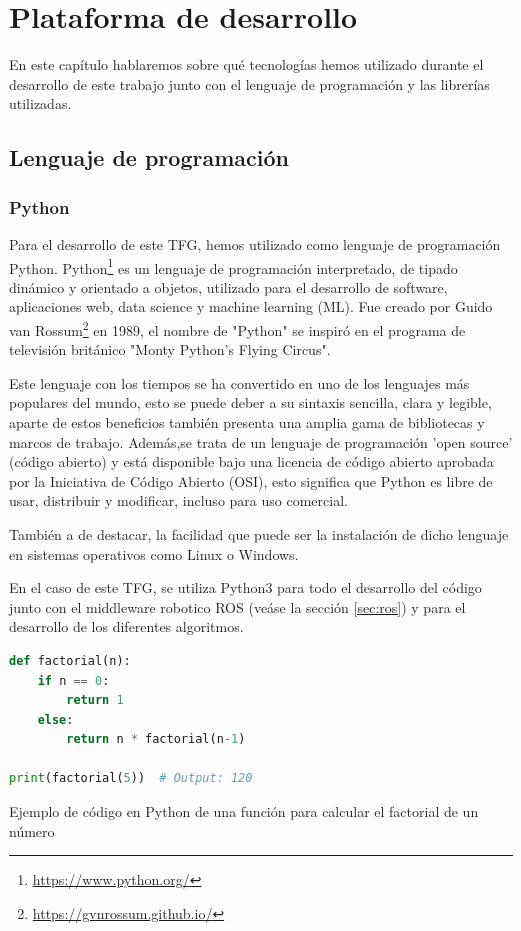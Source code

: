 \chapter{Plataforma de desarrollo}
\label{cap:capitulo3}

En este capítulo hablaremos sobre qué tecnologías hemos utilizado durante el desarrollo de este trabajo junto con el lenguaje de programación y las librerías utilizadas.
\section{Lenguaje de programación}
\label{sec:programación}
\subsection{Python}
\label{sec:python}
Para el desarrollo de este TFG, hemos utilizado como lenguaje de programación Python. Python\footnote{\url{https://www.python.org/}} es un lenguaje de programación interpretado, 
de tipado dinámico y orientado a objetos,
utilizado para el desarrollo de software, aplicaciones web, data science y machine learning (ML).  
Fue creado por Guido van Rossum\footnote{\url{https://gvnrossum.github.io/}} en 1989, el nombre de "Python" se inspiró en el programa de televisión británico 
"Monty Python's Flying Circus". \newline

Este lenguaje con los tiempos se ha convertido en uno de los lenguajes más populares del mundo, esto se puede deber a su sintaxis sencilla, clara y legible, aparte 
de estos beneficios también presenta una amplia gama de bibliotecas y marcos de trabajo. Además,se trata de un lenguaje de programación 'open source' (código abierto) y está disponible bajo
una licencia de código abierto aprobada por la Iniciativa de Código Abierto (OSI), esto significa que Python es libre de usar, distribuir y modificar, incluso para uso
comercial. \newline

También a de destacar, la facilidad que puede ser la instalación de dicho lenguaje en sistemas operativos como Linux o Windows. \newline

En el caso de este TFG, se utiliza Python3 para todo el desarrollo del código junto con el middleware robotico ROS (veáse la sección \ref{sec:ros}) y para el desarrollo
de los diferentes algoritmos. 
\newline

\begin{code}[h]
\begin{lstlisting}[language=Python]
  def factorial(n):
    if n == 0:
        return 1
    else:
        return n * factorial(n-1)

print(factorial(5))  # Output: 120

\end{lstlisting}
\caption[Ejemplo de código en Python de una función para calcular el factorial de un número]{Ejemplo de código en Python de una función para calcular el factorial de un número}
\label{cod:codejemplo}
\end{code}  



